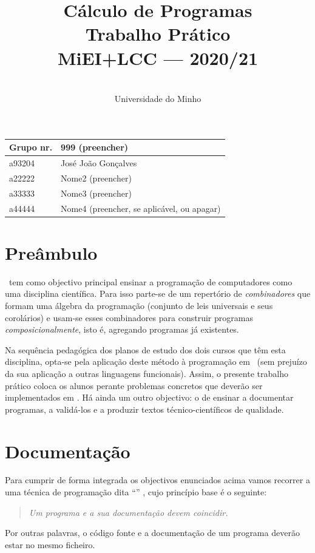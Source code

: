 \documentclass[a4paper]{article}
\title{
       	Cálculo de Programas
\\
       	Trabalho Prático
\\
       	MiEI+LCC --- 2020/21
}
\author{
       	\dium
\\
       	Universidade do Minho
}
\date\mydate
\begin{document}
\maketitle

\begin{center}\large
\begin{tabular}{ll}
\textbf{Grupo} nr. & 999 (preencher)
\\\hline
a93204 & José João Gonçalves	
\\
a22222 & Nome2 (preencher)	
\\
a33333 & Nome3 (preencher)	
\\
a44444 & Nome4 (preencher, se aplicável, ou apagar)	
\end{tabular}
\end{center}

\section{Preâmbulo}

\CP\ tem como objectivo principal ensinar
a progra\-mação de computadores como uma disciplina científica. Para isso
parte-se de um repertório de \emph{combinadores} que formam uma álgebra da
programação (conjunto de leis universais e seus corolários) e usam-se esses
combinadores para construir programas \emph{composicionalmente}, isto é,
agregando programas já existentes.
  
Na sequência pedagógica dos planos de estudo dos dois cursos que têm
esta disciplina, opta-se pela aplicação deste método à programação
em \Haskell\ (sem prejuízo da sua aplicação a outras linguagens 
funcionais). Assim, o presente trabalho prático coloca os
alunos perante problemas concretos que deverão ser implementados em
\Haskell.  Há ainda um outro objectivo: o de ensinar a documentar
programas, a validá-los e a produzir textos técnico-científicos de
qualidade.

\section{Documentação} Para cumprir de forma integrada os objectivos
enunciados acima vamos recorrer a uma técnica de programa\-ção dita
``'' \cite{Kn92}, cujo princípio base é o seguinte:
%
\begin{quote}\em Um programa e a sua documentação devem coincidir.
\end{quote}
%
Por outras palavras, o código fonte e a documentação de um
programa deverão estar no mesmo ficheiro.
\end{document}
